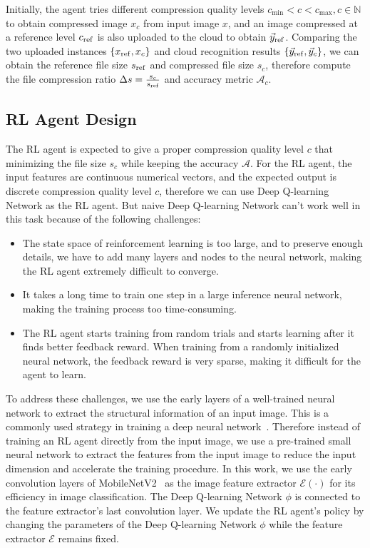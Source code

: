 Initially, the agent tries different compression quality levels $ c_{\min} < c < c_{\max}, c \in \mathbb{N} $ to obtain compressed image $ x_c $ from input image $ x $, and an image compressed at a reference level $ c_{\rm ref} $ is also uploaded to the cloud to obtain $ \vec{y}_{\rm ref} $. Comparing the two uploaded instances $ \{x_{\rm ref}, x_c\} $ and cloud recognition results $ \{\vec{y}_{\rm ref}, \vec{y}_c\} $, we can obtain the reference file size $ s_{\rm ref} $ and compressed file size $ s_c $, therefore compute the file compression ratio $ \Delta s = \frac{s_c}{s_{\rm ref}} $ and accuracy metric $ \mathcal{A}_c $.

\subsection{RL Agent Design}

The RL agent is expected to give a proper compression quality level $ c $ that minimizing the file size $ s_c $ while keeping the accuracy $ \mathcal{A} $. For the RL agent, the input features are continuous numerical vectors, and the expected output is discrete compression quality level $ c $, therefore we can use Deep Q-learning Network \cite{DQN} as the RL agent. But naive Deep Q-learning Network can't work well in this task because of the following challenges: %

\begin{itemize}
    \item The state space of reinforcement learning is too large, and to preserve enough details, we have to add many layers and nodes to the neural network, making the RL agent extremely difficult to converge. 
    \item It takes a long time to train one step in a large inference neural network, making the training process too time-consuming.
    \item The RL agent starts training from random trials and starts learning after it finds better feedback reward. When training from a randomly initialized neural network, the feedback reward is very sparse, making it difficult for the agent to learn.
\end{itemize}

To address these challenges, we use the early layers of a well-trained neural network to extract the structural information of an input image. This is a commonly used strategy in training a deep neural network~\cite{finetunning,finetunning2}. Therefore instead of training an RL agent directly from the input image, we use a pre-trained small neural network to extract the features from the input image to reduce the input dimension and accelerate the training procedure. In this work, we use the early convolution layers of MobileNetV2~\cite{MobileNetV2} as the image feature extractor $ \mathcal{E}(\cdot) $ for its efficiency in image classification. The Deep Q-learning Network $ \phi $ is connected to the feature extractor's last convolution layer. We update the RL agent's policy by changing the parameters of the Deep Q-learning Network $ \phi $ while the feature extractor $ \mathcal{E} $ remains fixed. %

